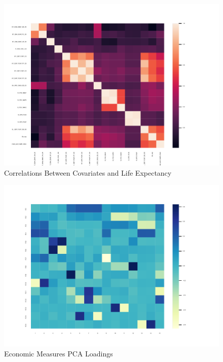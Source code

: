 \documentclass[12pt]{article}
\begin{document}
    \begin{figure}[h!]
        \centering
        \caption{Correlations Between Covariates and Life Expectancy}
        \label{LE_Health_Econ_Correlations}	
        \includegraphics[width=\linewidth,keepaspectratio=true]{../Output/Figures/LE_Health_Econ_Correlations.pdf}
    \end{figure}

    \begin{figure}[h!]
        \centering
        \caption{Economic Measures PCA Loadings}
        \label{Econ_Loadings}	
        \includegraphics[width=\linewidth,keepaspectratio=true]{../Output/Figures/Econ_Indicator_Loadings.pdf}
    \end{figure}
\end{document}
